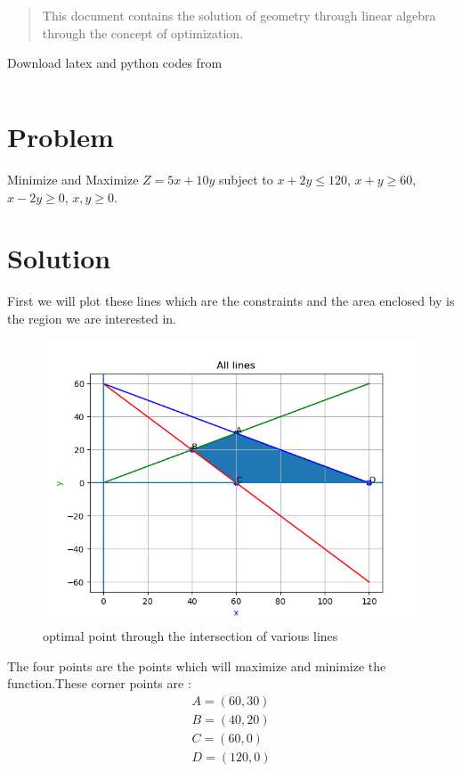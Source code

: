 \begin{abstract}
This document contains the solution of geometry through linear algebra through the concept of optimization.
\end{abstract}
Download latex and python codes from 
\begin{lstlisting}

\end{lstlisting}
%
\section{Problem}
Minimize and Maximize $Z=5x+10y$ subject to $x+2y\leq120$, $x+y\geq60$, $x-2y\geq0$, $x,y\geq0$.\\
\section{Solution}

First we will plot these lines which are the constraints and the area enclosed by is the region we are interested in.

\begin{figure}[h]
\includegraphics[width=\columnwidth]{figs/Figure_1.png}
\caption{optimal point through the intersection of various lines}
\label{fig:Figure_1}
\end{figure}

The four points are the points which will maximize and minimize the function.These corner points are :
\begin{align*}
    A=(60,30)
\\
    B=(40,20)
\\
    C=(60,0)
\\
    D=(120,0)
\end{align*}


